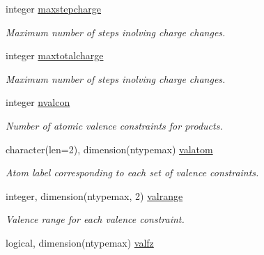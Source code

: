 \begin{DoxyCompactItemize}
integer \mbox{\hyperlink{namespaceglobaldata_ad30f540d6848058c4bfccdbf99be9fea}{maxstepcharge}}
\begin{DoxyCompactList}\small\item\em Maximum number of steps inolving charge changes. \end{DoxyCompactList}\item 
\mbox{\label{namespaceglobaldata_a00f35b1400ab0075949a6a0dab900df9}} 
integer \mbox{\hyperlink{namespaceglobaldata_a00f35b1400ab0075949a6a0dab900df9}{maxtotalcharge}}
\begin{DoxyCompactList}\small\item\em Maximum number of steps inolving charge changes. \end{DoxyCompactList}\item 
\mbox{\label{namespaceglobaldata_a4770520e1eb7dda0344ed370337caf90}} 
integer \mbox{\hyperlink{namespaceglobaldata_a4770520e1eb7dda0344ed370337caf90}{nvalcon}}
\begin{DoxyCompactList}\small\item\em Number of atomic valence constraints for products. \end{DoxyCompactList}\item 
\mbox{\label{namespaceglobaldata_af94df2e033c7b7b1154976802e885907}} 
character(len=2), dimension(ntypemax) \mbox{\hyperlink{namespaceglobaldata_af94df2e033c7b7b1154976802e885907}{valatom}}
\begin{DoxyCompactList}\small\item\em Atom label corresponding to each set of valence constraints. \end{DoxyCompactList}\item 
\mbox{\label{namespaceglobaldata_a90144032246145f06310f124eb22c320}} 
integer, dimension(ntypemax, 2) \mbox{\hyperlink{namespaceglobaldata_a90144032246145f06310f124eb22c320}{valrange}}
\begin{DoxyCompactList}\small\item\em Valence range for each valence constraint. \end{DoxyCompactList}\item 
\mbox{\label{namespaceglobaldata_a56b0e215c522933435baaca139d6c1a7}} 
logical, dimension(ntypemax) \mbox{\hyperlink{namespaceglobaldata_a56b0e215c522933435baaca139d6c1a7}{valfz}}

\end{DoxyCompactItemize}
